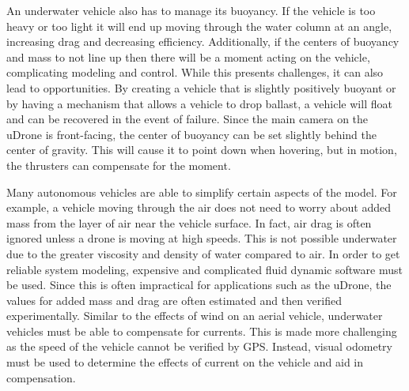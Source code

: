 An underwater vehicle also has to manage its buoyancy. If the vehicle is too heavy or too light it will end up moving through the water column at an angle, increasing drag and decreasing efficiency. Additionally, if the centers of buoyancy and mass to not line up then there will be a moment acting on the vehicle, complicating modeling and control. While this presents challenges, it can also lead to opportunities. By creating a vehicle that is slightly positively buoyant or by having a mechanism that allows a vehicle to drop ballast, a vehicle will float and can be recovered in the event of failure. Since the main camera on the uDrone is front-facing, the center of buoyancy can be set slightly behind the center of gravity. This will cause it to point down when hovering, but in motion, the thrusters can compensate for the moment. 

Many autonomous vehicles are able to simplify certain aspects of the model. For example, a vehicle moving through the air does not need to worry about added mass from the layer of air near the vehicle surface. In fact, air drag is often ignored unless a drone is moving at high speeds. This is not possible underwater due to the greater viscosity and density of water compared to air. In order to get reliable system modeling, expensive and complicated fluid dynamic software must be used. Since this is often impractical for applications such as the uDrone, the values for added mass and drag are often estimated and then verified experimentally. 
Similar to the effects of wind on an aerial vehicle, underwater vehicles must be able to compensate for currents. This is made more challenging as the speed of the vehicle cannot be verified by GPS. Instead, visual odometry must be used to determine the effects of current on the vehicle and aid in compensation. 

